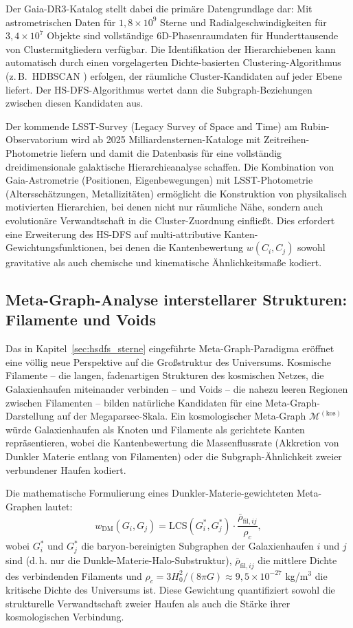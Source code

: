 ﻿\documentclass[a4paper,12pt]{report}
\theoremstyle{definition}
\begin{document}
Der Gaia-DR3-Katalog \cite{gaia2022} stellt dabei die primäre Datengrundlage dar: Mit astrometrischen Daten für $1{,}8 \times 10^9$ Sterne und Radialgeschwindigkeiten für $3{,}4 \times 10^7$ Objekte sind vollständige 6D-Phasenraumdaten für Hunderttausende von Clustermitgliedern verfügbar. Die Identifikation der Hierarchiebenen kann automatisch durch einen vorgelagerten Dichte-basierten Clustering-Algorithmus (z.\,B.\ HDBSCAN \cite{campello2013}) erfolgen, der räumliche Cluster-Kandidaten auf jeder Ebene liefert. Der HS-DFS-Algorithmus wertet dann die Subgraph-Beziehungen zwischen diesen Kandidaten aus.

Der kommende LSST-Survey (Legacy Survey of Space and Time) am Rubin-Observato\-rium wird ab 2025 Milliardensternen-Kataloge mit Zeitreihen-Photometrie liefern und damit die Datenbasis für eine vollständig dreidimensionale galaktische Hierarchieanalyse schaffen. Die Kombination von Gaia-Astrometrie (Positionen, Eigenbewegungen) mit LSST-Photometrie (Altersschätzungen, Metallizitäten) ermöglicht die Konstruktion von physikalisch motivierten Hierarchien, bei denen nicht nur räumliche Nähe, sondern auch evolutionäre Verwandtschaft in die Cluster-Zuordnung einfließt. Dies erfordert eine Erweiterung des HS-DFS auf multi-attributive Kanten-Gewichtungsfunktionen, bei denen die Kantenbewertung $w(C_i, C_j)$ sowohl gravitative als auch chemische und kinematische Ähnlichkeitsmaße kodiert.

\subsection{Meta-Graph-Analyse interstellarer Strukturen: Filamente und Voids}

Das in Kapitel~\ref{sec:hsdfs_sterne} eingeführte Meta-Graph-Paradigma eröffnet eine völlig neue Perspektive auf die Großstruktur des Universums. Kosmische Filamente -- die langen, fadenartigen Strukturen des kosmischen Netzes, die Galaxienhaufen miteinander verbinden -- und Voids -- die nahezu leeren Regionen zwischen Filamenten -- bilden natürliche Kandidaten für eine Meta-Graph-Darstellung auf der Megaparsec-Skala. Ein kosmologischer Meta-Graph $\mathcal{M}^{(\mathrm{kos})}$ würde Galaxienhaufen als Knoten und Filamente als gerichtete Kanten repräsentieren, wobei die Kantenbewertung die Massenflussrate (Akkretion von Dunkler Materie entlang von Filamenten) oder die Subgraph-Ähnlichkeit zweier verbundener Haufen kodiert.

Die mathematische Formulierung eines Dunkler-Materie-gewichteten Meta-Graphen lautet:
\[
w_{\mathrm{DM}}(G_i, G_j) = \mathrm{LCS}(G_i^*, G_j^*) \cdot \frac{\bar{\rho}_{\mathrm{fil},ij}}{\rho_c},
\]
wobei $G_i^*$ und $G_j^*$ die baryon-bereinigten Subgraphen der Galaxienhaufen $i$ und $j$ sind (d.\,h. nur die Dunkle-Materie-Halo-Substruktur), $\bar{\rho}_{\mathrm{fil},ij}$ die mittlere Dichte des verbindenden Filaments und $\rho_c = 3H_0^2 / (8\pi G) \approx 9{,}5 \times 10^{-27}$ kg/m$^3$ die kritische Dichte des Universums ist. Diese Gewichtung quantifiziert sowohl die strukturelle Verwandtschaft zweier Haufen als auch die Stärke ihrer kosmologischen Verbindung.
\end{document}
